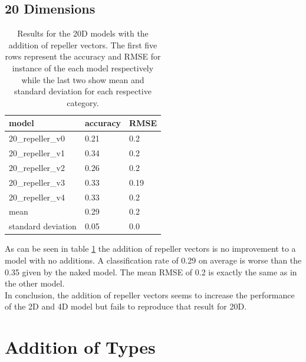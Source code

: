 \subsection{20 Dimensions}


\begin{table}[!htb]
	\centering
	\caption{Results for the 20D models with the addition of repeller vectors. The first five rows represent the accuracy and RMSE for instance of the each model respectively while the last two show mean and standard deviation for each respective category.}
	\begin{tabularx}{\textwidth}{ X  X  X }
		\hline
		model & accuracy & RMSE \\ 
		\hline
		20\_repeller\_v0 & 0.21 & 0.2 \\ 
		20\_repeller\_v1 & 0.34 & 0.2 \\
		20\_repeller\_v2 & 0.26 & 0.2 \\ 
		20\_repeller\_v3 & 0.33 & 0.19 \\ 
		20\_repeller\_v4 & 0.33 & 0.2 \\
		\hline
		mean & 0.29 & 0.2\\
		standard deviation & 0.05 & 0.0 \\
		\hline
	\end{tabularx}
	\label{table:20_repeller}
\end{table}

As can be seen in table \ref{table:20_repeller} the addition of repeller vectors is no improvement to a model with no additions. A classification rate of 0.29 on average is worse than the 0.35 given by the naked model. The mean RMSE of 0.2 is exactly the same as in the other model.\\
In conclusion, the addition of repeller vectors seems to increase the performance of the 2D and 4D model but fails to reproduce that result for 20D.

\section{Addition of Types}

